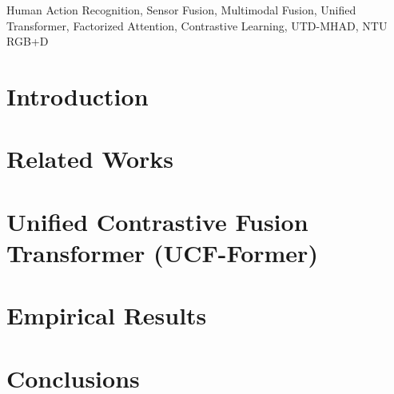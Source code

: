 \documentclass[letterpaper,journal]{IEEEtran}
\begin{document}
\begin{IEEEkeywords}
Human Action Recognition, Sensor Fusion, Multimodal Fusion, Unified Transformer, Factorized Attention, Contrastive Learning, UTD-MHAD, NTU RGB+D
\end{IEEEkeywords}

\section{Introduction}\label{sec1}


\section{Related Works}\label{sec2}


\section{Unified Contrastive Fusion Transformer (UCF-Former)}\label{sec3}


\section{Empirical Results}\label{sec4}


\section{Conclusions}\label{sec5}

\end{document}
